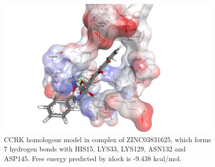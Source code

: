 \begin{figure}
\centering
\includegraphics[width=\linewidth]{../ccrk/1HCL-ZINC03831625.png}
\caption{CCRK homologous model in complex of ZINC03831625, which forms 7 hydrogen bonds with HIS15, LYS33, LYS129, ASN132 and ASP145. Free energy predicted by idock is -9.438 kcal/mol.}
\label{Case:1HCL-ZINC03831625}
\end{figure}


\chapterend
